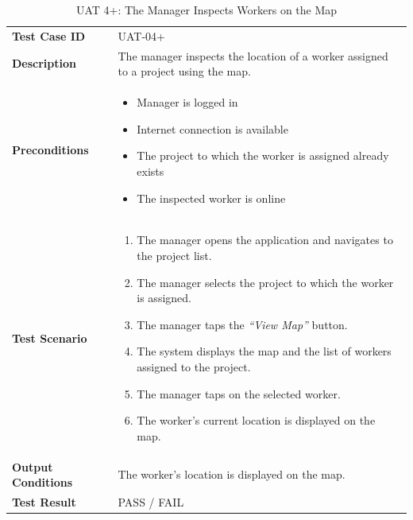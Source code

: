 \documentclass[12pt,a4paper]{article}
\begin{document}
\begin{table}[h]
\centering
\caption{UAT 4+: The Manager Inspects Workers on the Map}
\begin{tabularx}{\textwidth}{>{\bfseries}l X}
\toprule
Test Case ID & UAT-04+ \\
Description & The manager inspects the location of a worker assigned to a project using the map. \\
Preconditions &
\begin{itemize}[noitemsep]
    \item Manager is logged in
    \item Internet connection is available
    \item The project to which the worker is assigned already exists
    \item The inspected worker is online
\end{itemize} \\
Test Scenario &
\begin{enumerate}[noitemsep]
    \item The manager opens the application and navigates to the project list.
    \item The manager selects the project to which the worker is assigned.
    \item The manager taps the \emph{``View Map''} button.
    \item The system displays the map and the list of workers assigned to the project.
    \item The manager taps on the selected worker.
    \item The worker's current location is displayed on the map.
\end{enumerate} \\
Output Conditions & The worker's location is displayed on the map. \\
Test Result & PASS / FAIL \\
\bottomrule
\end{tabularx}
\end{table}
\end{document}
